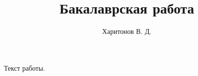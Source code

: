 \documentclass[a4paper,bachelor,draft]{disser}
\title{Бакалаврская работа}
\author{Харитонов В. Д.} %
\date{\number\year}
\begin{document}
\maketitle
    Текст работы.
\end{document}
